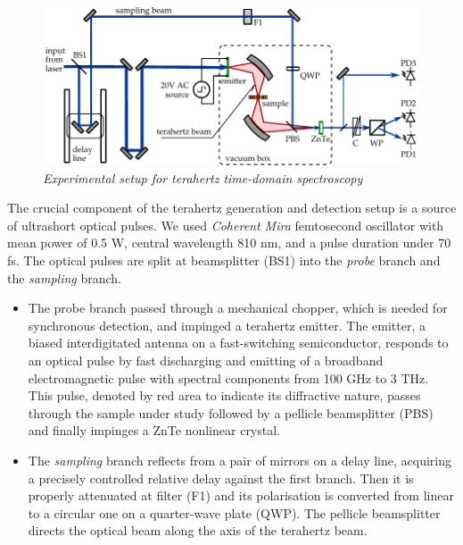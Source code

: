\begin{figure}[ht] \caption{\textit{Experimental setup for terahertz time-domain spectroscopy}} \label{fg_exp} \centering 
	\includegraphics[width=12cm]{img/exp_THz_sampling.pdf}
\end{figure}

The crucial component of the terahertz generation and detection setup is a source of ultrashort optical pulses. We used \textit{Coherent Mira} femtosecond oscillator with mean power of 0.5 W, central wavelength 810 nm,  and a pulse duration under 70 fs. The optical pulses are split at beamsplitter (BS1) into the \textit{probe} branch and the \textit{sampling} branch. 
\begin{itemize}
 \item{The probe branch passed through a mechanical chopper, which is needed for synchronous detection, and impinged a terahertz emitter. The emitter, a biased interdigitated antenna on a fast-switching semiconductor, responds to an optical pulse by fast discharging and emitting of a broadband electromagnetic pulse with spectral components from 100 GHz to 3 THz. This pulse, denoted by red area to indicate its diffractive nature, passes through the sample under study followed by a pellicle beamsplitter (PBS) and finally impinges a ZnTe nonlinear crystal. } 
 \item{The \textit{sampling} branch reflects from a pair of mirrors on a delay line, acquiring a precisely controlled relative delay against the first branch. Then it is properly attenuated at filter (F1) and its polarisation is converted from linear to a circular one on a quarter-wave plate (QWP). The pellicle beamsplitter directs the optical beam along the axis of the terahertz beam.} 
 \end{itemize}
